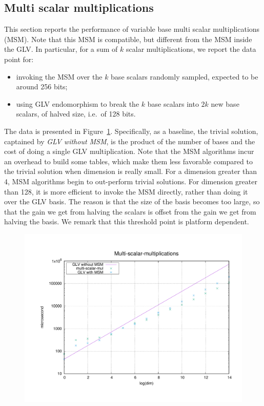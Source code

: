 \documentclass{article}
\theoremstyle{definition}
\begin{document}
\subsection{Multi scalar multiplications}
This section reports the performance of variable base 
multi scalar multiplications (MSM). Note that this MSM is 
compatible, but
different
from the MSM inside the GLV. 
In particular, for a sum of $k$ scalar multiplications,
we report the data point for: 
\begin{itemize}
  \item invoking the MSM over the $k$ base scalars randomly sampled,
    expected to be around 256 bits;
  \item using GLV endomorphism to break the $k$ base scalars into $2k$
    new base scalars, of halved size, i.e.~of 128 bits.
\end{itemize}
The data is presented in Figure~\ref{fig:msm}. Specifically, 
as a baseline, the trivial solution, captained by 
{\em GLV without 
MSM}, is the product of the number of bases and the cost of
doing a single GLV multiplication. 
Note that the MSM algorithms incur an overhead to build some
tables, which make them less favorable compared to the trivial
solution when dimension is really small. For a dimension greater 
than 4, MSM algorithms begin to out-perform trivial solutions.
For dimension greater than 128, it is more efficient to 
invoke the MSM directly, rather than doing it over the GLV basis.
The reason is that the size of the basis becomes too large, so
that the gain we get from halving the scalars is offset from the
gain we get from halving the basis. We remark that this threshold
point is platform dependent.
\begin{figure}[h]\centering \label{fig:msm}
  \includegraphics[width=12cm]{fig/msm.pdf}
\end{figure}
\end{document}
